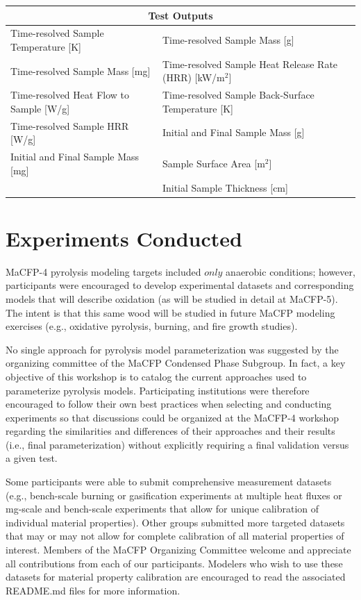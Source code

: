 \documentclass{book}
\begin{document}
\begin{table}[ht]
\begin{center}
\begin{tabular}{ll}
\hline
\multicolumn{2}{c}{Test Outputs}                                                                         \\ \hline
Time-resolved Sample Temperature [K] 	& Time-resolved Sample Mass [g]                       \\
Time-resolved Sample Mass [mg]             	& Time-resolved Sample Heat Release Rate (HRR) [kW/m$^2$]    \\
Time-resolved Heat Flow to Sample [W/g]  	& Time-resolved Sample Back-Surface Temperature [K]    \\
Time-resolved Sample HRR [W/g]  		& Initial and Final Sample Mass [g]                   \\
Initial and Final Sample Mass [mg]         	& Sample Surface Area [m$^2$]                             \\
									& Initial Sample Thickness [cm]\\
\hline
\end{tabular}
\end{center}
\end{table}

\chapter{Experiments Conducted}
MaCFP-4 pyrolysis modeling targets included $only$ anaerobic conditions; however, participants were encouraged to develop experimental datasets and corresponding models that will describe oxidation (as will be studied in detail at MaCFP-5). The intent is that this same wood will be studied in future MaCFP modeling exercises (e.g., oxidative pyrolysis, burning, and fire growth studies).

No single approach for pyrolysis model parameterization was suggested by the organizing committee of the MaCFP Condensed Phase Subgroup. In fact, a key objective of this workshop is to catalog the current approaches used to parameterize pyrolysis models. Participating institutions were therefore encouraged to follow their own best practices when selecting and conducting experiments so that discussions could be organized at the MaCFP-4 workshop regarding the similarities and differences of their approaches and their results (i.e., final parameterization) without explicitly requiring a final validation versus a given test.

Some participants were able to submit comprehensive measurement datasets (e.g., bench-scale burning or gasification experiments at multiple heat fluxes or mg-scale and bench-scale experiments that allow for unique calibration of individual material properties).  Other groups submitted more targeted datasets that may or may not allow for complete calibration of all material properties of interest. Members of the MaCFP Organizing Committee welcome and appreciate all contributions from each of our participants. Modelers who wish to use these datasets for material property calibration are encouraged to read the associated README.md files for more information.
\end{document}
